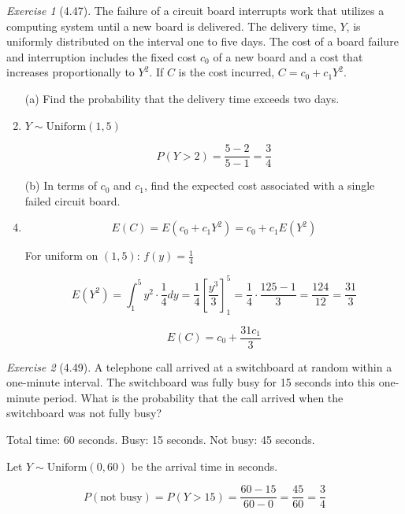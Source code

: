 \documentclass[12pt]{amsart}
\makeatletter
\theoremstyle{remark}
\newtheorem*{exercise}{Exercise}%
\renewenvironment{proof}[1][\proofname]{\par\doublespacing
  \pushQED{\qed}%
  \normalfont \topsep6\p@\@plus6\p@\relax
  \list{}{%
    \settowidth{\leftmargin}{\itshape\proofname:\hskip\labelsep}%
    \setlength{\labelwidth}{0pt}%
    \setlength{\itemindent}{-\leftmargin}%
  }%
  \item[\hskip\labelsep\itshape#1\@addpunct{:}]\ignorespaces
}{%
  \popQED\endlist\@endpefalse
  \singlespacing
}
\theoremstyle{mycomment}
\makeatother
\begin{document}
\begin{exercise}[4.47]
The failure of a circuit board interrupts work that utilizes a computing system until a new board is delivered. The delivery time, $Y$, is uniformly distributed on the interval one to five days. The cost of a board failure and interruption includes the fixed cost $c_0$ of a new board and a cost that increases proportionally to $Y^2$. If $C$ is the cost incurred, $C = c_0 + c_1Y^2$.

\begin{enumerate}
    \item[(a)] Find the probability that the delivery time exceeds two days.
\begin{proof}[Solution]
$Y \sim \text{Uniform}(1, 5)$

$$P(Y > 2) = \frac{5 - 2}{5 - 1} = \frac{3}{4}$$
\end{proof}

    \item[(b)] In terms of $c_0$ and $c_1$, find the expected cost associated with a single failed circuit board.
\begin{proof}[Solution]
$$E(C) = E(c_0 + c_1Y^2) = c_0 + c_1E(Y^2)$$

For uniform on $(1, 5)$: $f(y) = \frac{1}{4}$

$$E(Y^2) = \int_1^5 y^2 \cdot \frac{1}{4} dy = \frac{1}{4}\left[\frac{y^3}{3}\right]_1^5 = \frac{1}{4} \cdot \frac{125 - 1}{3} = \frac{124}{12} = \frac{31}{3}$$

$$E(C) = c_0 + \frac{31c_1}{3}$$
\end{proof}
\end{enumerate}
\end{exercise}
\begin{exercise}[4.49]
A telephone call arrived at a switchboard at random within a one-minute interval. The switchboard was fully busy for 15 seconds into this one-minute period. What is the probability that the call arrived when the switchboard was not fully busy?

\begin{proof}[Solution]
Total time: 60 seconds. Busy: 15 seconds. Not busy: 45 seconds.

Let $Y \sim \text{Uniform}(0, 60)$ be the arrival time in seconds.

$$P(\text{not busy}) = P(Y > 15) = \frac{60 - 15}{60 - 0} = \frac{45}{60} = \frac{3}{4}$$
\end{proof}
\end{exercise}
\end{document}
